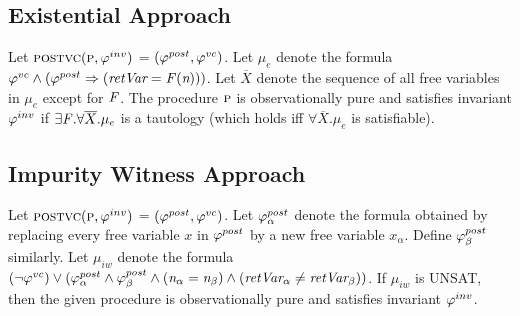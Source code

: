 \subsection{Existential Approach}

Let $\textsc{postvc}({\textsc{p}},{\varphi^{inv}})$ = $(\varphi^{post},\varphi^{vc})$.
Let $\mu_e$ denote the formula $\varphi^{vc} \wedge (\varphi^{post} \Rightarrow (\textit{retVar} = \mathit{F}(\textit{n})))$.
Let $\overline{X}$ denote the sequence of all free variables in $\mu_e$ except for $\mathit{F}$.
The procedure $\textsc{p}$ is observationally pure and satisfies invariant $\varphi^{inv}$ if
$\exists \mathit{F}. \forall \overline{X}. \mu_e$ is a tautology (which holds iff
$\forall \overline{X}. \mu_e$ is satisfiable).

\subsection{Impurity Witness Approach}

Let $\textsc{postvc}({\textsc{p}},{\varphi^{inv}})$ = $(\varphi^{post},\varphi^{vc})$.
Let $\varphi^{post}_\alpha$ denote the formula obtained by replacing every free variable $x$ in $\varphi^{post}$
by a new free variable $x_\alpha$. Define $\varphi^{post}_\beta$ similarly.
Let $\mu_{iw}$ denote the formula $(\neg \varphi^{vc}) \vee (\varphi^{post}_\alpha \wedge \varphi^{post}_\beta \wedge (\textit{n}_\alpha = \textit{n}_\beta) \wedge (\textit{retVar}_\alpha \neq \textit{retVar}_\beta))$.
If $\mu_{iw}$ is UNSAT, then the given procedure is observationally pure and satisfies invariant $\varphi^{inv}$.